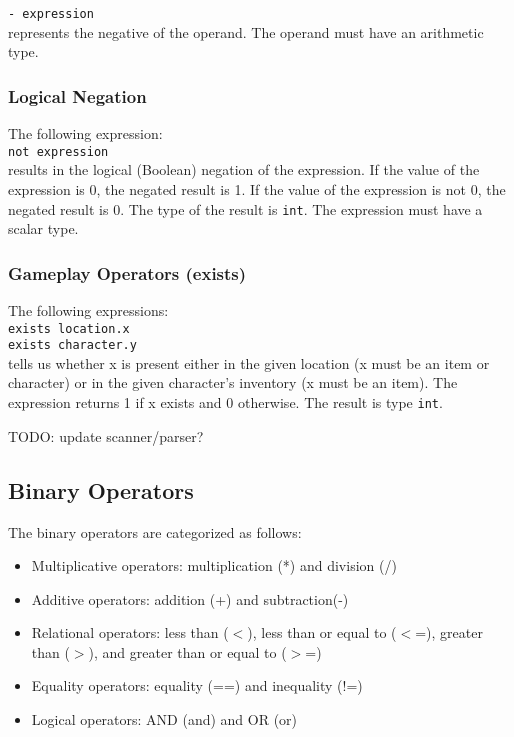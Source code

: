 \documentclass[12pt]{article}
\begin{document}
\texttt{- expression} \\

\noindent represents the negative of the operand.  The operand must have an arithmetic type.

\subsubsection{Logical Negation}

The following expression: \\

\texttt{not expression} \\

\noindent results in the logical (Boolean) negation of the expression.  If the value of the expression is 0, the negated result is 1.  If the value of the expression is not 0, the negated result is 0.  The type of the result is \texttt{int}.  The expression must have a scalar type.

\subsubsection{Gameplay Operators (exists)}
The following expressions: \\

\texttt{exists location.x} \\
\indent \texttt{exists character.y} \\

\noindent tells us whether x is present either in the given location (x must be an item or character) or in the given character's inventory (x must be an item).  The expression returns 1 if x exists and 0 otherwise.  The result is type \texttt{int}.

TODO: update scanner/parser?

\subsection{Binary Operators}
The binary operators are categorized as follows:
\begin{itemize}
\item Multiplicative operators: multiplication (*) and division (/)
\item Additive operators: addition (+) and subtraction(-)
\item Relational operators: less than ($<$), less than or equal to ($<$=), greater than ($>$), and greater than or equal to ($>$=)
\item Equality operators: equality (==) and inequality (!=)
\item Logical operators: AND (and) and OR (or)
\end{itemize}
\end{document}
